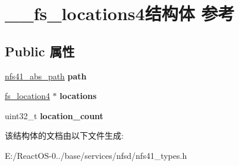 \hypertarget{struct____fs__locations4}{}\section{\+\_\+\+\_\+fs\+\_\+locations4结构体 参考}
\label{struct____fs__locations4}
\subsection*{Public 属性}
\begin{DoxyCompactItemize}
\item 
\mbox{\label{struct____fs__locations4_a71642fc7bfa046d5639051984a722f89}} 
\hyperlink{struct____nfs41__abs__path}{nfs41\+\_\+abs\+\_\+path} {\bfseries path}
\item 
\mbox{\label{struct____fs__locations4_a573a39da77e3c15bb61103c17cbe9fa5}} 
\hyperlink{struct____fs__location4}{fs\+\_\+location4} $\ast$ {\bfseries locations}
\item 
\mbox{\label{struct____fs__locations4_ae16ca0e939731d59196558e1c55e9def}} 
uint32\+\_\+t {\bfseries location\+\_\+count}
\end{DoxyCompactItemize}


该结构体的文档由以下文件生成\+:\begin{DoxyCompactItemize}
\item 
E\+:/\+React\+O\+S-\/0../base/services/nfsd/nfs41\+\_\+types.\+h\end{DoxyCompactItemize}
